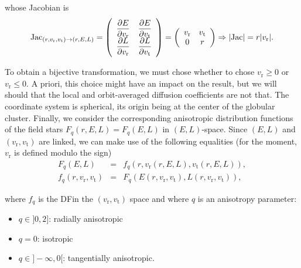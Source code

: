 \documentclass[11pt]{article}
\newcommand{\DF}{\ac{DF}}
\newcommand{\rt}{\mathrm{t}}
\newcommand{\rr}{\mathrm{r}}
\newcommand{\vr}{v_{\rr}}
\newcommand{\vt}{v_{\rt}}
\newcommand{\Fq}{F_{q}}
\newcommand{\fq}{f_{q}}
\begin{document}
whose Jacobian is
\begin{equation}
{\rm Jac}_{(r,\vr,\vt)\rightarrow(r,E,L)}=\left(\begin{array}{cc}
\displaystyle{\frac{\partial E}{\partial \vr}} & \displaystyle{\frac{\partial E}{\partial \vt}}\\
\displaystyle{\frac{\partial L}{\partial \vr}} & \displaystyle{\frac{\partial L}{\partial \vt}}
\end{array}\right)=\left(\begin{array}{cc}
\vr & \vt\\
0 & r
\end{array}\right)\Rightarrow|{\rm Jac}|=r|\vr| .
\label{eq:Jacobian}
  \end{equation}

To obtain a bijective transformation, we must chose whether to chose
$\vr\ge 0$ or $\vr\leq 0$. A priori, this choice might have an
impact on the result, but we will should that the local and orbit-averaged
diffusion coefficients are not that. The coordinate system is spherical,
its origin being at the center of the globular cluster. Finally, we
consider the corresponding anisotropic distribution functions of the
field stars $\Fq(r,E,L)= \Fq(E,L)$ in $(E,L)$-space. Since $(E,L)$
and $(\vr,\vt)$ are linked, we can make use of the following
equalities (for the moment, $\vr$ is defined modulo the sign)
\begin{equation}
\begin{array}{ccl}
\Fq(E,L) &=&\displaystyle{\fq(r,\vr(r,E,L),\vt(r,E,L))} ,\\
\fq(r,\vr,\vt)&=&\displaystyle{F_{q}(E(r,\vr,\vt),L(r,\vr,\vt))} ,
\end{array}
\label{eq:conversion_DF}
\end{equation}

where $\fq$ is the \DF in the $(\vr,\vt)$ space and where $q$ is an anisotropy
parameter:
\begin{itemize}
\item $q\in]0,2]$: radially anisotropic
\item $q=0$: isotropic
\item $q\in]-\infty,0[$: tangentially anisotropic.
\end{itemize}
\end{document}
